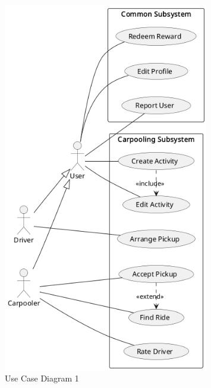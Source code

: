 \documentclass[11pt]{article}
\begin{document}





\begin{figure}
    \centering
    \includegraphics[width=0.8\textwidth]{use-cases-carpooling}
    \caption{Use Case Diagram 1}
\end{figure}
\end{document}
